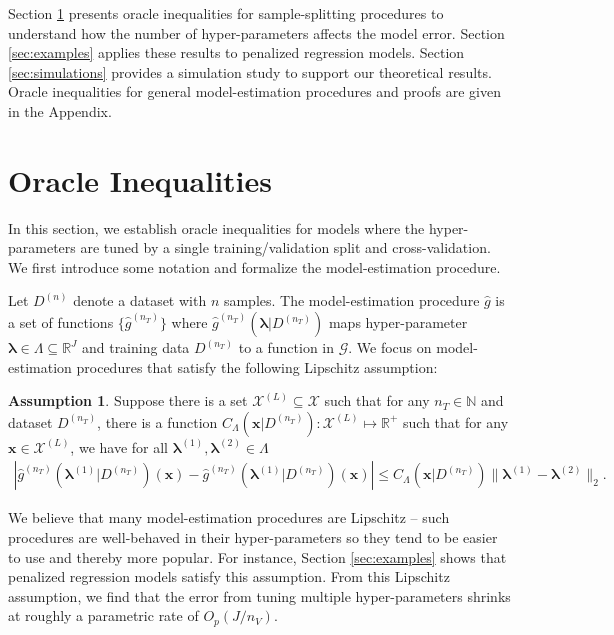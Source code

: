 \documentclass[12pt]{article} %
\theoremstyle{definition}
\newtheorem{assump}{Assumption}
\begin{document}
Section \ref{sec:main_results} presents oracle inequalities for sample-splitting procedures to understand how the number of hyper-parameters affects the model error.
Section \ref{sec:examples} applies these results to penalized regression models.
Section \ref{sec:simulations} provides a simulation study to support our theoretical results.
Oracle inequalities for general model-estimation procedures and proofs are given in the Appendix.



\section{Oracle Inequalities} \label{sec:main_results}

In this section, we establish oracle inequalities for models where the hyper-parameters are tuned by a single training/validation split and cross-validation. We first introduce some notation and formalize the model-estimation procedure. 

Let $D^{(n)}$ denote a dataset with $n$ samples. The model-estimation procedure $\hat{g}$ is a set of functions $\{\hat{g}^{(n_T)}\}$ where $\hat{g}^{(n_T)}(\boldsymbol{\lambda} | D^{(n_T)})$ maps hyper-parameter $\boldsymbol{\lambda} \in \Lambda \subseteq \mathbb{R}^J$ and training data $D^{(n_T)}$ to a function in $\mathcal{G}$.
We focus on model-estimation procedures that satisfy the following Lipschitz assumption:
\begin{assump}
	\label{assump:lipschitz}
	Suppose there is a set $\mathcal{X}^{(L)} \subseteq \mathcal{X}$ such that for any $n_T \in \mathbb{N}$ and dataset $D^{(n_T)}$, there is a function $C_\Lambda(\boldsymbol{x} | D^{(n_T)}) : \mathcal{X}^{(L)} \mapsto \mathbb{R}^+$ such that for any $\boldsymbol{x} \in \mathcal{X}^{(L)}$, we have for all $\boldsymbol{\lambda}^{(1)}, \boldsymbol{\lambda}^{(2)} \in \Lambda$
	\begin{align}
	\left |
	\hat{g}^{(n_T)}(\boldsymbol{\lambda}^{(1)}|D^{(n_T)})(\boldsymbol{x}) - \hat{g}^{(n_T)}(\boldsymbol{\lambda}^{(1)}|D^{(n_T)})(\boldsymbol{x}) \right |
	\le C_\Lambda(\boldsymbol{x}|D^{(n_T)}) \|\boldsymbol{\lambda}^{(1)} - \boldsymbol{\lambda}^{(2)}\|_2.
	\end{align}
\end{assump}
\noindent
We believe that many model-estimation procedures are Lipschitz -- such procedures are well-behaved in their hyper-parameters so they tend to be easier to use and thereby more popular.
For instance, Section \ref{sec:examples} shows that penalized regression models satisfy this assumption.
From this Lipschitz assumption, we find that the error from tuning multiple hyper-parameters shrinks at roughly a parametric rate of $O_p(J/n_V)$.
\end{document}
